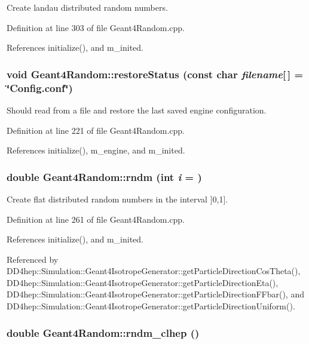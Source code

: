 Create landau distributed random numbers. 

Definition at line 303 of file Geant4Random.cpp.

References initialize(), and m\_\-inited.\hypertarget{class_d_d4hep_1_1_simulation_1_1_geant4_random_aad43065d6a4213d3ac0f3d9d024ce5ff}{
\subsubsection[{restoreStatus}]{\setlength{\rightskip}{0pt plus 5cm}void Geant4Random::restoreStatus (const char {\em filename}\mbox{[}$\,$\mbox{]} = {\ttfamily \char`\"{}Config.conf\char`\"{}})}}
\label{class_d_d4hep_1_1_simulation_1_1_geant4_random_aad43065d6a4213d3ac0f3d9d024ce5ff}


Should read from a file and restore the last saved engine configuration. 

Definition at line 221 of file Geant4Random.cpp.

References initialize(), m\_\-engine, and m\_\-inited.\hypertarget{class_d_d4hep_1_1_simulation_1_1_geant4_random_a4aaab596ee59a7ae5cbee9cbfde250d5}{
\subsubsection[{rndm}]{\setlength{\rightskip}{0pt plus 5cm}double Geant4Random::rndm (int {\em i} = {})}}
\label{class_d_d4hep_1_1_simulation_1_1_geant4_random_a4aaab596ee59a7ae5cbee9cbfde250d5}


Create flat distributed random numbers in the interval \mbox{]}0,1\mbox{]}. 

Definition at line 261 of file Geant4Random.cpp.

References initialize(), and m\_\-inited.

Referenced by DD4hep::Simulation::Geant4IsotropeGenerator::getParticleDirectionCosTheta(), DD4hep::Simulation::Geant4IsotropeGenerator::getParticleDirectionEta(), DD4hep::Simulation::Geant4IsotropeGenerator::getParticleDirectionFFbar(), and DD4hep::Simulation::Geant4IsotropeGenerator::getParticleDirectionUniform().\hypertarget{class_d_d4hep_1_1_simulation_1_1_geant4_random_a691d3cc880c5db6fab4699784a8b375c}{
\subsubsection[{rndm\_\-clhep}]{\setlength{\rightskip}{0pt plus 5cm}double Geant4Random::rndm\_\-clhep ()}}
\label{class_d_d4hep_1_1_simulation_1_1_geant4_random_a691d3cc880c5db6fab4699784a8b375c}


